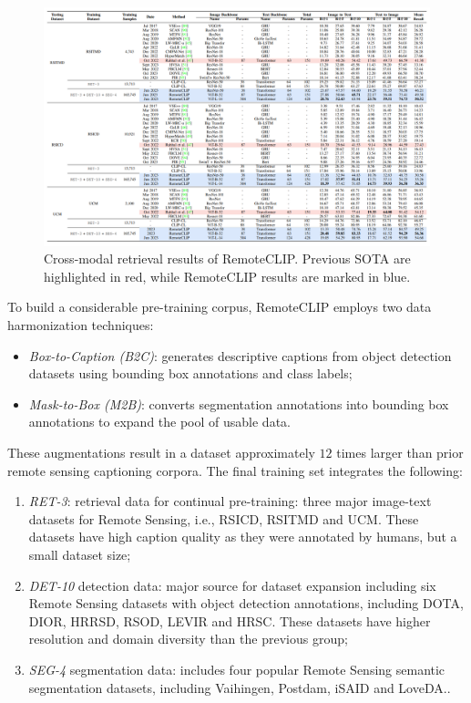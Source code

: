 \documentclass[a4paper, oneside, english]{sapthesis} %
\begin{document}
\begin{figure}[h]
    \centering
    \includegraphics[width=\textwidth]{img/remoteclip-retrieval-performance.png}
    \caption{Cross-modal retrieval results of RemoteCLIP. Previous SOTA are highlighted in red, while RemoteCLIP results are marked in blue.}
    \label{fig:remoteclip-performance}
\end{figure}

To build a considerable pre-training corpus, RemoteCLIP employs two data harmonization techniques:

\begin{itemize}
    \item \emph{Box-to-Caption (B2C)}: generates descriptive captions from object detection datasets using bounding box annotations and class labels;
    \item \emph{Mask-to-Box (M2B)}: converts segmentation annotations into bounding box annotations to expand the pool of usable data.
\end{itemize}
These augmentations result in a dataset approximately $12$ times larger than prior remote sensing captioning corpora. The final training set integrates the following:
\begin{enumerate}
    \item \emph{RET-3}: retrieval data for continual pre-training: three major image-text datasets for Remote Sensing, i.e., RSICD, RSITMD and UCM. These datasets have high caption quality as they were annotated by humans, but a small dataset size;
    \item \emph{DET-10} detection data: major source for dataset expansion including six Remote Sensing datasets with object detection annotations, including DOTA, DIOR, HRRSD, RSOD, LEVIR and HRSC. These datasets have higher resolution and domain diversity than the previous group;
    \item \emph{SEG-4} segmentation data: includes four popular Remote Sensing semantic segmentation datasets, including Vaihingen, Postdam, iSAID and LoveDA..
\end{enumerate}
\end{document}
